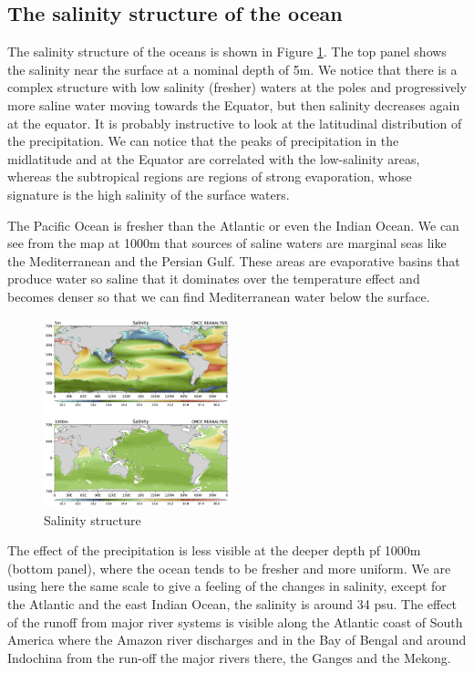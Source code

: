 \subsection{The salinity structure of the ocean }
The salinity structure of the oceans is shown in Figure \ref{fig:fig1}.  The top panel shows the salinity near the surface at a nominal depth of
5m. We notice that there is a complex structure with low salinity
(fresher) waters at the poles and progressively more saline water moving towards the Equator, but then salinity decreases again at the equator. It is probably instructive to look at the latitudinal distribution of the precipitation. We can notice that the peaks of precipitation in the midlatitude and at the Equator are correlated with the low-salinity areas, whereas the subtropical regions are regions of strong evaporation, whose signature is the high salinity of the surface waters.

The Pacific Ocean is fresher than the Atlantic or even the Indian Ocean.
We can see from the map at 1000m that sources of saline waters are
marginal seas like the Mediterranean and the Persian Gulf. These areas
are evaporative basins that produce water so saline that it dominates
over the temperature effect and becomes denser so that we can find
Mediterranean water below the surface.
\begin{figure}
	\begin{center}
		\includegraphics[width=0.48\textwidth]{uploads/26image.png}
	\end{center}
	\caption{Salinity structure}
	\label{fig:fig1}
\end{figure}


The effect of the precipitation is less visible at the deeper depth pf
1000m (bottom panel), where the ocean tends to be fresher and more
uniform. We are using here the same scale to give a feeling of the
changes in salinity, except for the Atlantic and the east Indian Ocean,
the salinity is around 34 psu.
The effect of the runoff from major river systems is visible along the
Atlantic coast of South America where the Amazon river discharges and in the Bay of Bengal and around Indochina from the run-off the major rivers there, the Ganges and the Mekong.



